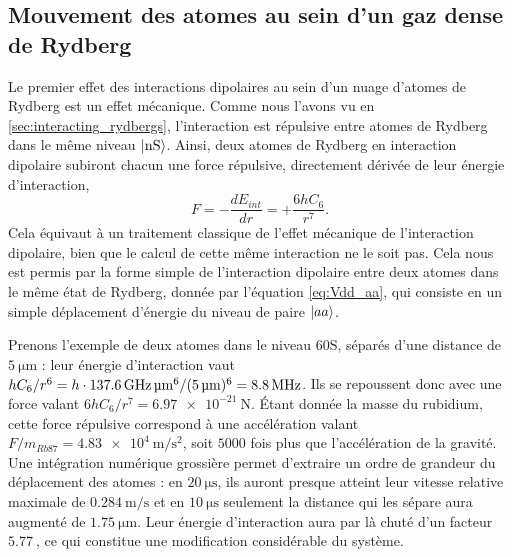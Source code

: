 	\subsection{Mouvement des atomes au sein d'un gaz dense de Rydberg}
	\noindent Le premier effet des interactions dipolaires au sein d'un nuage d'atomes de Rydberg est un effet mécanique.
Comme nous l'avons vu en \ref{sec:interacting_rydbergs}, l'interaction est répulsive entre atomes de Rydberg dans le même niveau $\ket{\mathrm{nS}}$.
Ainsi, deux atomes de Rydberg en interaction dipolaire subiront chacun une force répulsive, directement dérivée de leur énergie d'interaction,
\begin{equation}
\label{eq:repuls_2atoms}
F = - \frac{d E_{int}}{dr}  = + \frac{6hC_6}{r^7}.
\end{equation}
Cela équivaut à un traitement classique de l'effet mécanique de l'interaction dipolaire, bien que le calcul de cette même interaction ne le soit pas.
Cela nous est permis par la forme simple de l'interaction dipolaire entre deux atomes dans le même état de Rydberg, donnée par l'équation \eqref{eq:Vdd_aa}, qui consiste en un simple déplacement d'énergie du niveau de paire $\ket{aa}$.

Prenons l'exemple de deux atomes dans le niveau $\mathrm{60S}$, séparés d'une distance de $\SI{5}{\um}$ : leur énergie d'interaction vaut $hC_6/r^6 = h\cdot {\SI{137.6}{\GHz\raiseto{6}\um}}/(\SI{5}{\um})^6 = \SI{8.8}{\MHz}$.
Ils se repoussent donc avec une force valant %
$6hC_6/r^7 =\SI{6.97e-21}{\newton}$.
Étant donnée la masse du rubidium, cette force répulsive correspond à une accélération valant $F/m_{Rb87} = \SI{4.83e4}{\m\per\s\squared}$, soit $\num{5000}$ fois plus que l'accélération de la gravité.
Une intégration numérique grossière permet d'extraire un ordre de grandeur du déplacement des atomes : en $\SI{20}{\us}$, ils auront presque atteint leur vitesse relative maximale de $\SI{0.284}{\m\per\s}$ et en $\SI{10}{\us}$ seulement la distance qui les sépare aura augmenté de $\SI{1.75}{\um}$.
Leur énergie d'interaction aura par là chuté d'un facteur $\SI{5.77}{}$, ce qui constitue une modification considérable du système.


